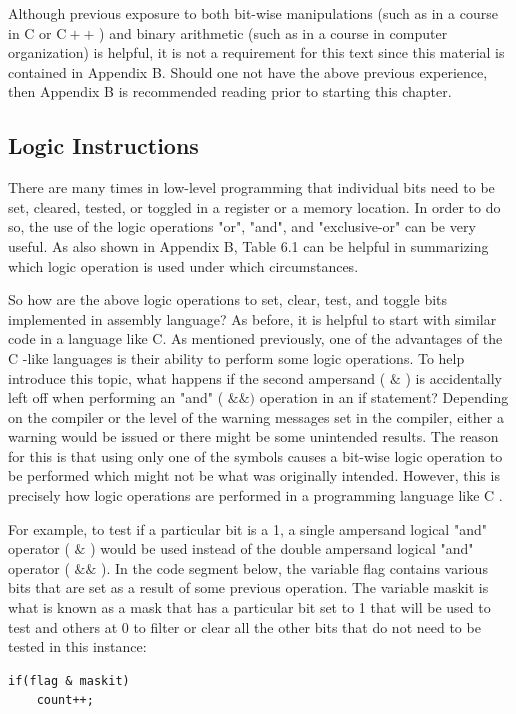 \documentclass[10pt]{book}
\begin{document}
Although previous exposure to both bit-wise manipulations (such as in a course in C or $\mathrm{C}++$ ) and binary arithmetic (such as in a course in computer organization) is helpful, it is not a requirement for this text since this material is contained in Appendix B. Should one not have the above previous experience, then Appendix B is recommended reading prior to starting this chapter.

\subsection{Logic Instructions}
There are many times in low-level programming that individual bits need to be set, cleared, tested, or toggled in a register or a memory location. In order to do so, the use of the logic operations "or", "and", and "exclusive-or" can be very useful. As also shown in Appendix B, Table 6.1 can be helpful in summarizing which logic operation is used under which circumstances.

So how are the above logic operations to set, clear, test, and toggle bits implemented in assembly language? As before, it is helpful to start with similar code in a language like C. As mentioned previously, one of the advantages of the C -like languages is their ability to perform some logic operations. To help introduce this topic, what happens if the second ampersand ( $\&$ ) is accidentally left off when performing an "and" ( $\& \&)$ operation in an if statement? Depending on the compiler or the level of the warning messages set in the compiler, either a warning would be issued or there might be some unintended results. The reason for this is that using only one of the symbols causes a bit-wise logic operation to be performed which might not be what was originally intended. However, this is precisely how logic operations are performed in a programming language like C .

For example, to test if a particular bit is a 1, a single ampersand logical "and" operator ( $\&$ ) would be used instead of the double ampersand logical "and" operator ( $\& \&$ ). In the code segment below, the variable flag contains various bits that are set as a result of some previous operation. The variable maskit is what is known as a mask that has a particular bit set to 1 that will be used to test and others at 0 to filter or clear all the other bits that do not need to be tested in this instance:

\begin{verbatim}
if(flag & maskit)
    count++;
\end{verbatim}
\end{document}
